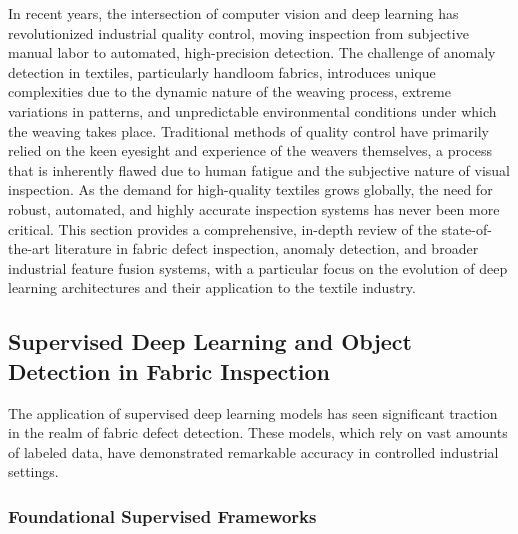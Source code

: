 \documentclass{ieeeaccess}
\begin{document}
In recent years, the intersection of computer vision and deep learning has revolutionized industrial quality control, moving inspection from subjective manual labor to automated, high-precision detection. The challenge of anomaly detection in textiles, particularly handloom fabrics, introduces unique complexities due to the dynamic nature of the weaving process, extreme variations in patterns, and unpredictable environmental conditions under which the weaving takes place. Traditional methods of quality control have primarily relied on the keen eyesight and experience of the weavers themselves, a process that is inherently flawed due to human fatigue and the subjective nature of visual inspection. As the demand for high-quality textiles grows globally, the need for robust, automated, and highly accurate inspection systems has never been more critical. This section provides a comprehensive, in-depth review of the state-of-the-art literature in fabric defect inspection, anomaly detection, and broader industrial feature fusion systems, with a particular focus on the evolution of deep learning architectures and their application to the textile industry.

\subsection{Supervised Deep Learning and Object Detection in Fabric Inspection}

The application of supervised deep learning models has seen significant traction in the realm of fabric defect detection. These models, which rely on vast amounts of labeled data, have demonstrated remarkable accuracy in controlled industrial settings.

\subsubsection{Foundational Supervised Frameworks}
\end{document}
